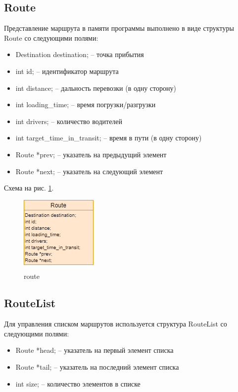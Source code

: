 \subsection{Route}

Представление маршрута в памяти программы выполнено в виде структуры Route со следующими полями:

\begin{itemize}
    \item Destination destination; -- точка прибытия
    \item int id; -- идентификатор маршрута
    \item int distance; -- дальность перевозки (в одну сторону)
    \item int loading\_time; -- время погрузки/разгрузки
    \item int drivers; -- количество водителей
    \item int target\_time\_in\_transit; -- время в пути (в одну сторону)
    \item Route *prev; -- указатель на предыдущий элемент
    \item Route *next; -- указатель на следующий элемент
\end{itemize}

Схема на рис. \ref{route}.

\begin{figure}[hpt!]
    \centering
    \includegraphics[width=0.4\linewidth]{photo/route}
    \caption{route}
    \label{route}
\end{figure}

\subsection{RouteList}

Для управления списком маршрутов используется структура RouteList со следующими полями:

\begin{itemize}
    \item Route *head; -- указатель на первый элемент списка
    \item Route *tail; -- указатель на последний элемент списка
    \item int size; -- количество элементов в списке
\end{itemize}

